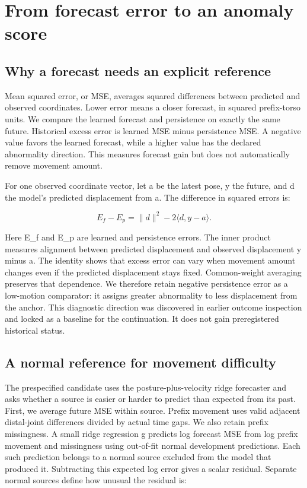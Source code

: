 \documentclass[letterpaper]{article}
\begin{document}
\section{From forecast error to an anomaly score}

\subsection{Why a forecast needs an explicit reference}

Mean squared error, or MSE, averages squared differences between predicted and observed coordinates. Lower error means a closer forecast, in squared prefix-torso units. We compare the learned forecast and persistence on exactly the same future. Historical excess error is learned MSE minus persistence MSE. A negative value favors the learned forecast, while a higher value has the declared abnormality direction. This measures forecast gain but does not automatically remove movement amount.

For one observed coordinate vector, let a be the latest pose, y the future, and d the model's predicted displacement from a. The difference in squared errors is:

\begin{equation}E_f-E_p=\lVert d\rVert^2-2\langle d,y-a\rangle.\end{equation}

Here E\_f and E\_p are learned and persistence errors. The inner product measures alignment between predicted displacement and observed displacement y minus a. The identity shows that excess error can vary when movement amount changes even if the predicted displacement stays fixed. Common-weight averaging preserves that dependence. We therefore retain negative persistence error as a low-motion comparator: it assigns greater abnormality to less displacement from the anchor. This diagnostic direction was discovered in earlier outcome inspection and locked as a baseline for the continuation. It does not gain preregistered historical status.

\subsection{A normal reference for movement difficulty}

The prespecified candidate uses the posture-plus-velocity ridge forecaster and asks whether a source is easier or harder to predict than expected from its past. First, we average future MSE within source. Prefix movement uses valid adjacent distal-joint differences divided by actual time gaps. We also retain prefix missingness. A small ridge regression g predicts log forecast MSE from log prefix movement and missingness using out-of-fit normal development predictions. Each such prediction belongs to a normal source excluded from the model that produced it. Subtracting this expected log error gives a scalar residual. Separate normal sources define how unusual the residual is:
\end{document}
